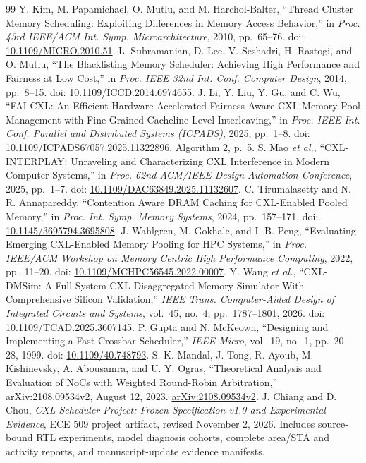 \documentclass[10pt,letterpaper,twocolumn]{article}
\begin{document}
\begin{thebibliography}{99}
 Y. Kim, M. Papamichael, O. Mutlu, and M. Harchol-Balter, ``Thread Cluster Memory Scheduling: Exploiting Differences in Memory Access Behavior,'' in \emph{Proc. 43rd IEEE/ACM Int. Symp. Microarchitecture}, 2010, pp.~65--76. doi: \href{https://doi.org/10.1109/MICRO.2010.51}{10.1109/MICRO.2010.51}.
 L. Subramanian, D. Lee, V. Seshadri, H. Rastogi, and O. Mutlu, ``The Blacklisting Memory Scheduler: Achieving High Performance and Fairness at Low Cost,'' in \emph{Proc. IEEE 32nd Int. Conf. Computer Design}, 2014, pp.~8--15. doi: \href{https://doi.org/10.1109/ICCD.2014.6974655}{10.1109/ICCD.2014.6974655}.
 J. Li, Y. Liu, Y. Gu, and C. Wu, ``FAI-CXL: An Efficient Hardware-Accelerated Fairness-Aware CXL Memory Pool Management with Fine-Grained Cacheline-Level Interleaving,'' in \emph{Proc. IEEE Int. Conf. Parallel and Distributed Systems (ICPADS)}, 2025, pp.~1--8. doi: \href{https://doi.org/10.1109/ICPADS67057.2025.11322896}{10.1109/ICPADS67057.2025.11322896}. Algorithm 2, p.~5.
 S. Mao \emph{et al.}, ``CXL-INTERPLAY: Unraveling and Characterizing CXL Interference in Modern Computer Systems,'' in \emph{Proc. 62nd ACM/IEEE Design Automation Conference}, 2025, pp.~1--7. doi: \href{https://doi.org/10.1109/DAC63849.2025.11132607}{10.1109/DAC63849.2025.11132607}.
 C. Tirumalasetty and N. R. Annapareddy, ``Contention Aware DRAM Caching for CXL-Enabled Pooled Memory,'' in \emph{Proc. Int. Symp. Memory Systems}, 2024, pp.~157--171. doi: \href{https://doi.org/10.1145/3695794.3695808}{10.1145/3695794.3695808}.
 J. Wahlgren, M. Gokhale, and I. B. Peng, ``Evaluating Emerging CXL-Enabled Memory Pooling for HPC Systems,'' in \emph{Proc. IEEE/ACM Workshop on Memory Centric High Performance Computing}, 2022, pp.~11--20. doi: \href{https://doi.org/10.1109/MCHPC56545.2022.00007}{10.1109/MCHPC56545.2022.00007}.
 Y. Wang \emph{et al.}, ``CXL-DMSim: A Full-System CXL Disaggregated Memory Simulator With Comprehensive Silicon Validation,'' \emph{IEEE Trans. Computer-Aided Design of Integrated Circuits and Systems}, vol.~45, no.~4, pp.~1787--1801, 2026. doi: \href{https://doi.org/10.1109/TCAD.2025.3607145}{10.1109/TCAD.2025.3607145}.
 P. Gupta and N. McKeown, ``Designing and Implementing a Fast Crossbar Scheduler,'' \emph{IEEE Micro}, vol.~19, no.~1, pp.~20--28, 1999. doi: \href{https://doi.org/10.1109/40.748793}{10.1109/40.748793}.
 S. K. Mandal, J. Tong, R. Ayoub, M. Kishinevsky, A. Abousamra, and U. Y. Ogras, ``Theoretical Analysis and Evaluation of NoCs with Weighted Round-Robin Arbitration,'' arXiv:2108.09534v2, August 12, 2023. \href{https://arxiv.org/abs/2108.09534v2}{arXiv:2108.09534v2}.
 J. Chiang and D. Chou, \emph{CXL Scheduler Project: Frozen Specification v1.0 and Experimental Evidence}, ECE 509 project artifact, revised November 2, 2026. Includes source-bound RTL experiments, model diagnosis cohorts, complete area/STA and activity reports, and manuscript-update evidence manifests.
\end{thebibliography}
\endgroup
\end{document}
